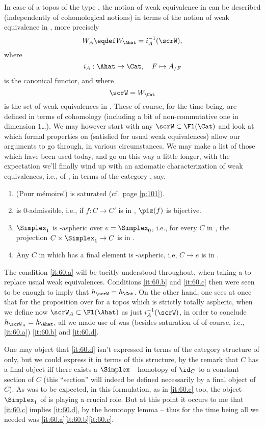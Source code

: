 In case of a topos of the type \Ahat, the notion of weak equivalence
in \Ahat{} can be described (independently of cohomological notions)
in terms of the notion of weak equivalence in \Cat, more precisely
\[W_A \eqdef W_\Ahat = i_A^{-1}(\scrW),\]
where
\[i_A:\Ahat\to\Cat, \quad F\mapsto A_{/F}\]
is the canonical functor, and where
\[\scrW=W_\Cat\]
is the set of weak equivalences in \Cat. These of course, for the time
being, are defined in terms of cohomology (including a bit of
non-commutative one in dimension $1$\ldots). We may however start with
any $\scrW\subset\Fl(\Cat)$ and look at which formal properties on
\scrW{} (satisfied for usual weak equivalences) allow our arguments to
go through, in various circumstances. We may make a list of those
which have been used today, and go on this way a little longer, with
the expectation we'll finally wind up with an axiomatic
characterization of weak equivalences, i.e., of \scrW, in terms of the
category \Cat, say.
\begin{enumerate}[label=\alph*)]
\item\label{it:60.a}
  (Pour m\'emoire!) \scrW{} is saturated (cf.\ page \ref{p:101}).
\item\label{it:60.b}
  \scrW{} is $0$-admissible, i.e., if $f:C\to C'$ is in \scrW,
  $\piz(f)$ is bijective.
\item\label{it:60.c}
  $\Simplex_1$ is \scrW-aspheric over $e=\Simplex_0$, i.e., for every $C$
  in \Cat, the projection $C\times\Simplex_1\to C$ is in \scrW.
\item\label{it:60.d}
  Any $C$ in \Cat{} which has a final element is \scrW-aspheric, i.e,
  $C\to e$ is in \scrW.
\end{enumerate}

The condition \ref{it:60.a} will be tacitly understood
throughout, when taking a \scrW{} to replace usual weak
equivalences. Conditions \ref{it:60.b} and \ref{it:60.c} then were
seen to be enough to imply that $h_\scrW=h_\Cat$. On the other hand,
one sees at once that for the proposition over for a topos \Ahat{}
which is strictly totally aspheric, when we define now
$\scrW_A\subset\Fl(\Ahat)$ as just $i_A^{-1}(\scrW)$, in order to
conclude $h_{\scrW_A}=h_\Ahat$, all we made use of was (besides
saturation of \scrW{} of course, i.e., \ref{it:60.a}) \ref{it:60.b}
and \ref{it:60.d}.

One may object that \ref{it:60.d} isn't expressed in terms of the
category structure of \Cat{} only, but we could express it in terms of
this structure, by the remark that $C$ has a final object if{f} there
exists a $\Simplex^-$-homotopy of $\id_C$ to a constant section of $C$
(this ``section'' will indeed be defined necessarily by a final object
of $C$). As was to be expected, in this formulation, as in
\ref{it:60.c} too, the object $\Simplex_1$ of \Cat{} is playing a
crucial role. But at this point it occurs to me that \ref{it:60.c}
implies \ref{it:60.d}, by the homotopy lemma -- thus for the time
being all we needed was \ref{it:60.a}\ref{it:60.b}\ref{it:60.c}.

